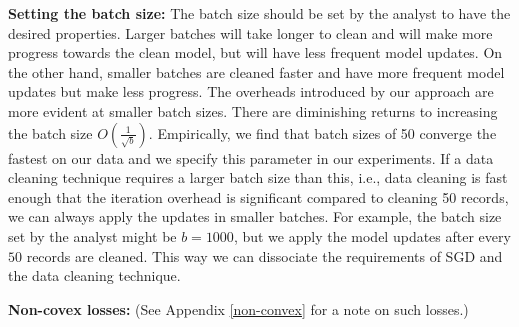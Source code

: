 \vspace{0.25em}

\noindent\textbf{ Setting the batch size: } The batch size should be set by the analyst to have the desired properties.
Larger batches will take longer to clean and will make more progress towards the clean model, but will have less frequent model updates.
On the other hand, smaller batches are cleaned faster and have more frequent model updates but make less progress.
The overheads introduced by our approach are more evident at smaller batch sizes.
There are diminishing returns to increasing the batch size $O(\frac{1}{\sqrt{b}})$.
Empirically, we find that batch sizes of 50 converge the fastest on our data and we specify this parameter in our experiments.
If a data cleaning technique requires a larger batch size than this, i.e., data cleaning is fast enough that the iteration overhead is significant compared to cleaning 50 records, we can always apply the updates in smaller batches.
For example, the batch size set by the analyst might be $b=1000$, but we apply the model updates after every $50$ records are cleaned.
This way we can dissociate the requirements of SGD and the data cleaning technique.

\vspace{0.5em}

\noindent\textbf{ Non-covex losses: } (See Appendix \ref{non-convex} for a note on such losses.)


